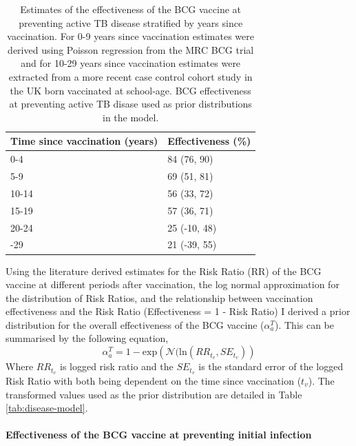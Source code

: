 \documentclass[11pt,twoside]{bristolthesis}
\begin{document}
  \begin{table}[!h]
  
  \caption[Estimates of the effectiveness of the BCG vaccine at preventing active TB disease stratified by years since vaccination.]{\label{tab:bcg-eff-est}Estimates of the effectiveness of the BCG vaccine at preventing active TB disease stratified by years since vaccination. For 0-9 years since vaccination estimates were derived using Poisson regression from the MRC BCG trial and for 10-29 years since vaccination estimates were extracted from a more recent case control cohort study in the UK born vaccinated at school-age. BCG effectiveness at preventing active TB disase used as prior distributions in the model.}
  \centering
  \begin{tabular}{ll}
  \toprule
  Time since vaccination (years) & Effectiveness (\%)\\
  \midrule
  0-4 & 84 (76, 90)\\
  5-9 & 69 (51, 81)\\
  10-14 & 56 (33, 72)\\
  15-19 & 57 (36, 71)\\
  20-24 & 25 (-10, 48)\\
  \addlinespace
  25-29 & 21 (-39, 55)\\
  \bottomrule
  \end{tabular}
  \end{table}
  Using the literature derived estimates for the Risk Ratio (RR) of the BCG vaccine at different periods after vaccination, the log normal approximation for the distribution of Risk Ratios, and the relationship between vaccination effectiveness and the Risk Ratio (Effectiveness = 1 - Risk Ratio) I derived a prior distribution for the overall effectiveness of the BCG vaccine (\(\alpha^T_a\)). This can be summarised by the following equation,
  \begin{equation}
    \alpha^T_a = 1 - \text{exp}\left(\mathcal{N}(\text{ln}(RR_{t_v}, SE_{t_v})\right)
    \label{eq:rr-to-alpha}
  \end{equation}
  Where \(RR_{t_v}\) is logged risk ratio and the \(SE_{t_v}\) is the standard error of the logged Risk Ratio with both being dependent on the time since vaccination (\(t_v\)). The transformed values used as the prior distribution are detailed in Table \ref{tab:disease-model}.
  
  \hypertarget{effectiveness-of-the-bcg-vaccine-at-preventing-initial-infection}{%
  \paragraph{Effectiveness of the BCG vaccine at preventing initial infection}\label{effectiveness-of-the-bcg-vaccine-at-preventing-initial-infection}}
  
\end{document}
